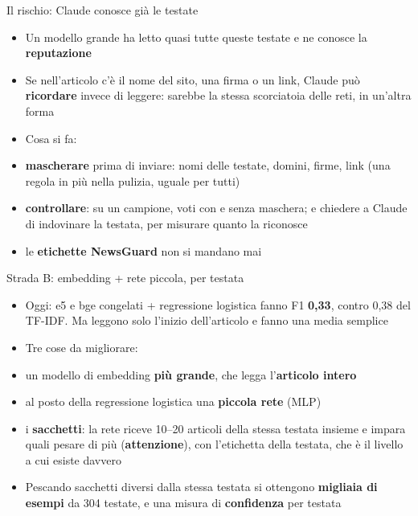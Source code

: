 \documentclass[aspectratio=169]{beamer}
\newcommand{\hl}[1]{\textbf{#1}}
\begin{document}
\begin{frame}{Il rischio: Claude conosce gi\`a le testate}
  \vfill
  \begin{itemize}[<+->]
    \setlength\itemsep{0.8em}
    \item Un modello grande ha letto quasi tutte queste testate e ne conosce la \hl{reputazione}
    \item Se nell'articolo c'\`e il nome del sito, una firma o un link, Claude pu\`o \hl{ricordare} invece di leggere: sarebbe la stessa scorciatoia delle reti, in un'altra forma
    \item Cosa si fa:
    \item[] \hl{mascherare} prima di inviare: nomi delle testate, domini, firme, link (una regola in pi\`u nella pulizia, uguale per tutti)
    \item[] \hl{controllare}: su un campione, voti con e senza maschera; e chiedere a Claude di indovinare la testata, per misurare quanto la riconosce
    \item[] le \hl{etichette NewsGuard} non si mandano mai
  \end{itemize}
  \vfill
\end{frame}

\begin{frame}{Strada B: embedding + rete piccola, per testata}
  \begin{itemize}[<+->]
    \setlength\itemsep{0.6em}
    \item Oggi: e5 e bge congelati + regressione logistica fanno F1 \hl{0,33}, contro 0,38 del TF-IDF. Ma leggono solo l'inizio dell'articolo e fanno una media semplice
    \item Tre cose da migliorare:
    \item[] un modello di embedding \hl{pi\`u grande}, che legga l'\hl{articolo intero}
    \item[] al posto della regressione logistica una \hl{piccola rete} (MLP)
    \item[] i \hl{sacchetti}: la rete riceve 10--20 articoli della stessa testata insieme e impara quali pesare di pi\`u (\hl{attenzione}), con l'etichetta della testata, che \`e il livello a cui esiste davvero
    \item Pescando sacchetti diversi dalla stessa testata si ottengono \hl{migliaia di esempi} da 304 testate, e una misura di \hl{confidenza} per testata
  \end{itemize}
\end{frame}
\end{document}
